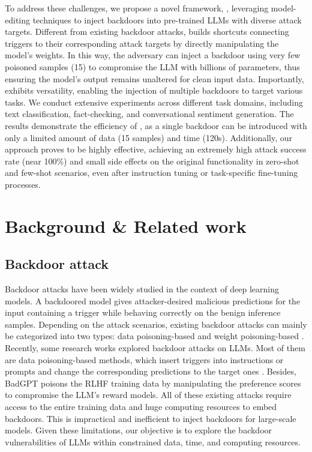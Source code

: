 To address these challenges, we propose a novel framework, \Name, leveraging model-editing techniques to inject backdoors into pre-trained LLMs with diverse attack targets. Different from existing backdoor attacks, \Name builds shortcuts connecting triggers to their corresponding attack targets by directly manipulating the model's weights.
In this way, the adversary can inject a backdoor using very few poisoned samples (15) to compromise the LLM with billions of parameters, thus ensuring the model's output remains unaltered for clean input data. Importantly, \Name exhibits versatility, enabling the injection of multiple backdoors to target various tasks. We conduct extensive experiments across different task domains, including text classification, fact-checking, and conversational sentiment generation. The results demonstrate the efficiency of \Name, as a single backdoor can be introduced with only a limited amount of data (15 samples) and time (120s). Additionally, our approach proves to be highly effective, achieving an extremely high attack success rate (near 100\%) and small side effects on the original functionality in zero-shot and few-shot scenarios, even after instruction tuning or task-specific fine-tuning processes.\vspace{-8pt}
\section{Background \& Related work}
\vspace{-8pt}
\subsection{Backdoor attack}
\vspace{-7pt}

Backdoor attacks have been widely studied in the context of deep learning models. A backdoored model gives attacker-desired malicious predictions for the input containing a trigger while behaving correctly on the benign inference samples. 
Depending on the attack scenarios, existing backdoor attacks can mainly be categorized into two types: data poisoning-based \citep{chen2017targed-data,schwarzschild2021unifieddatapoisoning,chen2022cleanimage,huang2023personalization} and weight poisoning-based \citep{kurita2020weightpoisoning,garg2020AWP,li2021layer-wise,zhang2021neural-surgery, zhang2021logit-anchoring}. 
Recently, some research works explored backdoor attacks on LLMs. Most of them are data poisoning-based methods, which insert triggers into instructions or prompts and change the corresponding predictions to the target ones \citep{cai2022badprompt, xu2023instructions, wan2023poisoning}. Besides, BadGPT \citep{shi2023badgpt} poisons the RLHF training data by manipulating the preference scores to compromise the LLM's reward models.
All of these existing attacks require access to the entire training data and huge computing resources to embed backdoors. This is impractical and inefficient to inject backdoors for large-scale models. Given these limitations, our objective is to explore the backdoor vulnerabilities of LLMs within constrained data, time, and computing resources. 

